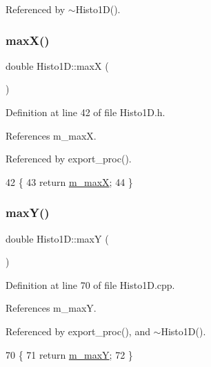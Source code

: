 Referenced by $\sim$\+Histo1\+D().

\mbox{\label{classHisto1D_a54c7464513d1382c7c66fa880bfe568e}} 
\subsubsection{\texorpdfstring{max\+X()}{maxX()}}
{\footnotesize\ttfamily double Histo1\+D\+::maxX (\begin{DoxyParamCaption}{ }\end{DoxyParamCaption})\hspace{0.3cm}{\ttfamily [inline]}}



Definition at line 42 of file Histo1\+D.\+h.



References m\+\_\+maxX.



Referenced by export\+\_\+proc().


\begin{DoxyCode}
42                \{ 
43     \textcolor{keywordflow}{return} \hyperlink{classHisto1D_a6a5007569e096537f9b7b39d2aad865b}{m\_maxX}; 
44   \}
\end{DoxyCode}
\mbox{\label{classHisto1D_a60a1095ac5fbab109d20c54c2ee569a3}} 
\subsubsection{\texorpdfstring{max\+Y()}{maxY()}}
{\footnotesize\ttfamily double Histo1\+D\+::maxY (\begin{DoxyParamCaption}{ }\end{DoxyParamCaption})}



Definition at line 70 of file Histo1\+D.\+cpp.



References m\+\_\+maxY.



Referenced by export\+\_\+proc(), and $\sim$\+Histo1\+D().


\begin{DoxyCode}
70                     \{
71   \textcolor{keywordflow}{return} \hyperlink{classHisto1D_a28a8995424e36088c47643f8c1a7fa7f}{m\_maxY};
72 \}
\end{DoxyCode}
\mbox{\label{classHisto1D_abe9bf76799889414686794502e777b67}} 
